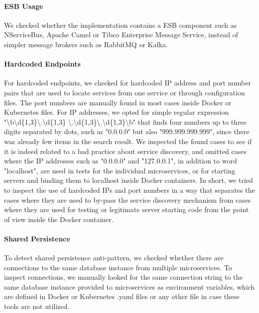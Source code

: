 \documentclass{Configuration_Files/PoliMi3i_thesis}
\begin{document}
\paragraph{ESB Usage} We checked whether the implementation contains a ESB component such as NServiceBus\footnotemark[63], Apache Camel\footnotemark[64] or Tibco Enterprise Message Service\footnotemark[65], instead of simpler message brokers such as RabbitMQ or Kafka.

\paragraph{Hardcoded Endpoints} For hardcoded endpoints, we checked for hardcoded IP address and port number pairs that are used to locate services from one service or through configuration files.
The port numbers are manually found in most cases inside Docker or Kubernetes files.
For IP addresses, we opted for simple regular expression "\textbackslash b\textbackslash d\{1,3\}\textbackslash .\textbackslash d\{1,3\}     \textbackslash .\textbackslash d\{1,3\}\textbackslash .\textbackslash d\{1,3\}\textbackslash b"
that finds four numbers up to three digits separated by dots, such as "0.0.0.0" but also "999.999.999.999", since there was already few items in the search result.
We inspected the found cases to see if it is indeed related to a bad practice about service discovery, and omitted cases where the IP addresses such as "0.0.0.0" and "127.0.0.1", in addition to word "localhost", are used in tests for the individual microservices, or for starting servers and binding them to localhost inside Docker containers.
In short, we tried to inspect the use of hardcoded IPs and port numbers in a way that separates the cases where they are used to by-pass the service discovery mechanism from cases where they are used for testing or legitimate server starting code from the point of view inside the Docker container.

\paragraph{Shared Persistence} To detect shared persistence anti-pattern, we checked whether there are connections to the same database instance from multiple microservices.
To inspect connections, we manually looked for the same connection string to the same database instance provided to microservices as environment variables, which are defined in Docker or Kubernetes .yaml files or any other file in case these tools are not utilized.
\end{document}
